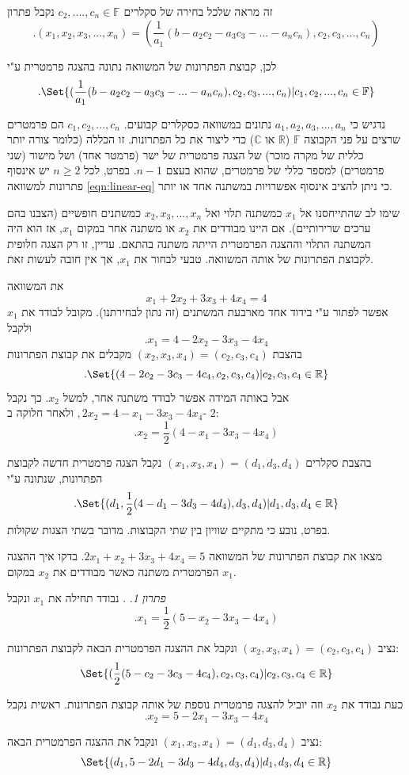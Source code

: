 \documentclass[
  hebrew,
  12pt,
  a4paper,
  oneside]{book}
\theoremstyle{definition}
\theoremstyle{remark}
\theoremstyle{plain}
\theoremstyle{remark}
\newtheorem*{solution}{פתרון}
\begin{document}
זה מראה שלכל בחירה של סקלרים \(c_2,....,c_n\in\mathbb F\) נקבל פתרון
\[.(x_1,x_2,x_3,...,x_n)=(\frac{1}{a_1}(b-a_2c_2-a_3c_3-...-a_nc_n),c_2,c_3,...,c_n)\]

לכן, קבוצת הפתרונות של המשוואה נתונה בהצגה פרמטרית ע"י
\[.\Set{(\frac{1}{a_1}(b-a_2c_2-a_3c_3-...-a_nc_n),c_2,c_3,...,c_n)|c_1,c_2,...,c_n\in\mathbb F}\]

נדגיש כי \(a_1,a_2,a_3,...,a_n\) נתונים במשוואה כסקלרים קבועים.
\(c_1,c_2,...,c_n\) הם פרמטרים שרצים על פני הקבוצה \(\mathbb F\)
(\(\mathbb R\) או \(\mathbb C\)) כדי ליצור את כל הפתרונות. זו הכללה
(כלומר צורה יותר כללית של מקרה מוכר) של הצגה פרמטרית של ישר (פרמטר אחד)
ושל מישור (שני פרמטרים) למספר כללי של פרמטרים, שהוא בעצם \(n-1\). בפרט,
לכל \(n\geq2\) יש אינסוף פתרונות למשוואה \ref{eqn:linear-eq} כי ניתן
להציב אינסוף אפשרויות במשתנה אחד או יותר.

שימו לב שהתייחסנו אל \(x_1\) כמשתנה תלוי ואל \(x_2,x_3,...,x_n\) כמשתנים
חופשיים (הצבנו בהם ערכים שרירותיים). אם היינו מבודדים את \(x_2\) או
משתנה אחר במקום \(x_1\), אז הוא היה המשתנה התלוי וההצגה הפרמטרית הייתה
משתנה בהתאם. עדיין, זו רק הצגה חלופית לקבוצת הפתרונות של אותה המשוואה.
טבעי לבחור את \(x_1\), אך אין חובה לעשות זאת.

\begin{example}

את המשוואה \[x_1+2x_2+3x_3+4x_4=4\] אפשר לפתור ע"י בידוד אחד מארבעת
המשתנים (זה נתון לבחירתנו). מקובל לבודד את \(x_1\) ולקבל
\[.x_1=4-2x_2-3x_3-4x_4\] בהצבת \((x_2,x_3,x_4)=(c_2,c_3,c_4)\) מקבלים
את קבוצת הפתרונות
\[.\Set{(4-2c_2-3c_3-4c_4,c_2,c_3,c_4)|c_2,c_3,c_4\in\mathbb R}\] אבל
באותה המידה אפשר לבודד משתנה אחר, למשל \(x_2\). כך נקבל
\(,2x_2=4-x_1-3x_3-4x_4\) ולאחר חלוקה ב- \(2\):
\[.x_2=\frac{1}{2}(4-x_1-3x_3-4x_4)\]

בהצבת סקלרים \((x_1,x_3,x_4)=(d_1,d_3,d_4)\) נקבל הצגה פרמטרית חדשה
לקבוצת הפתרונות, שנתונה ע"י
\[.\Set{(d_1,\frac{1}{2}(4-d_1-3d_3-4d_4),d_3,d_4)|d_1,d_3,d_4\in\mathbb R}\]
בפרט, נובע כי מתקיים שוויון בין שתי הקבוצות. מדובר בשתי הצגות שקולות.

\end{example}

\begin{exercise}

מצאו את קבוצת הפתרונות של המשוואה \(2x_1+x_2+3x_3+4x_4=5\). בדקו איך
ההצגה הפרמטרית משתנה כאשר מבודדים את \(x_2\) במקום \(x_1\).

\end{exercise}

\begin{solution}
. נבודד תחילה את \(x_1\) ונקבל \[.x_1=\frac{1}{2}(5-x_2-3x_3-4x_4)\]

נציב \((x_2,x_3,x_4)=(c_2,c_3,c_4)\) ונקבל את ההצגה הפרמטרית הבאה לקבוצת
הפתרונות:
\[\Set{(\frac{1}{2}(5-c_2-3c_3-4c_4),c_2,c_3,c_4)|c_2,c_3,c_4\in\mathbb R}\]

כעת נבודד את \(x_2\) וזה יוביל להצגה פרמטרית נוספת של אותה קבוצת
הפתרונות. ראשית נקבל \[.x_2=5-2x_1-3x_3-4x_4\]

נציב \((x_1,x_3,x_4)=(d_1,d_3,d_4)\) ונקבל את ההצגה הפרמטרית הבאה:
\[\Set{(d_1,5-2d_1-3d_3-4d_4,d_3,d_4)|d_1,d_3,d_4\in\mathbb R}\]
\end{solution}
\end{document}
